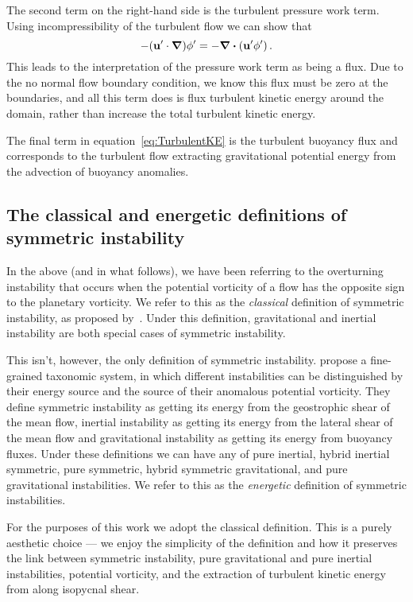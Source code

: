     The second term on the right-hand side is the turbulent pressure work term. Using incompressibility of the turbulent flow we can show that
    \begin{equation}
       - (\mathbf{u}'\cdot \grad) \phi ' = - \div{(\mathbf{u'}\phi ')} \, .
    \end{equation}
    This leads to the interpretation of the pressure work term as being a flux. Due to the no normal flow boundary condition, we know this flux must be zero at the boundaries, and all this term does is flux turbulent kinetic energy around the domain, rather than increase the total turbulent kinetic energy.
    
    The final term in equation~\ref{eq:TurbulentKE} is the turbulent buoyancy flux and corresponds to the turbulent flow extracting gravitational potential energy from the advection of buoyancy anomalies.

    \subsection{The classical and energetic definitions of symmetric instability}
    In the above (and in what follows), we have been referring to the overturning instability that occurs when the potential vorticity of a flow has the opposite sign to the planetary vorticity. We refer to this as the \textit{classical} definition of symmetric instability, as proposed by~\citet{Hoskins1974}. Under this definition, gravitational and inertial instability are both special cases of symmetric instability. 
    
    This isn't, however, the only definition of symmetric instability. \citet{Thomas2013} propose a fine-grained taxonomic system, in which different instabilities can be distinguished by their energy source and the source of their anomalous potential vorticity. They define symmetric instability as getting its energy from the geostrophic shear of the mean flow, inertial instability as getting its energy from the lateral shear of the mean flow and gravitational instability as getting its energy from buoyancy fluxes. Under these definitions we can have any of pure inertial, hybrid inertial symmetric, pure symmetric, hybrid symmetric gravitational, and pure gravitational instabilities. We refer to this as the \textit{energetic} definition of symmetric instabilities.

    For the purposes of this work we adopt the classical definition. This is a purely aesthetic choice --- we enjoy the simplicity of the definition and how it preserves the link between symmetric instability, pure gravitational and pure inertial instabilities, potential vorticity, and the extraction of turbulent kinetic energy from along isopycnal shear.

